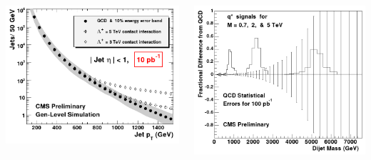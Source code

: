\documentclass[compress]{beamer}
\begin{document}
\begin{frame}
\begin{columns}
\includegraphics[width=\linewidth]{dijet_contactinteractions.png}

\includegraphics[width=\linewidth]{dijet_excited_quark.png}
\end{columns}
\label{dijets}
\end{frame}
\end{document}
